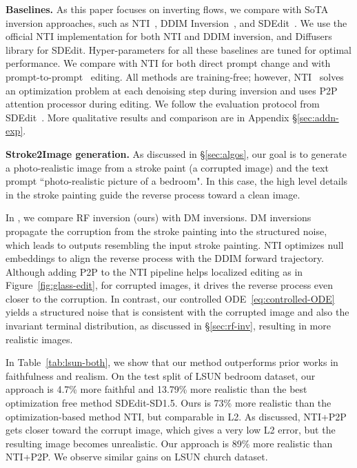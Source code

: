 \documentclass{article} %
\theoremstyle{plain}
\begin{document}
\textbf{Baselines.} 
As this paper focuses on inverting flows, we compare with SoTA inversion approaches, such as NTI~\citep{nti}, DDIM Inversion~\citep{ddim}, and SDEdit~\citep{sdedit}. 
We use the official NTI implementation for both NTI and DDIM inversion, and Diffusers library for SDEdit.
Hyper-parameters for all these baselines are tuned for optimal performance.
We compare with NTI for both direct prompt change and with prompt-to-prompt~\cite{p2p} editing.
All methods are training-free; however, NTI~\citep{nti} solves an optimization problem at each denoising step during inversion and uses P2P~\citep{p2p} attention processor during editing.
We follow the evaluation protocol from SDEdit~\citep{sdedit}. More qualitative results and comparison are in Appendix \S\ref{sec:addn-exp}.


\textbf{Stroke2Image generation.}
As discussed in \S\ref{sec:algos}, our goal is to generate a photo-realistic image from a stroke paint (a corrupted image) and the text prompt ``photo-realistic picture of a bedroom".
In this case, the high level details in the stroke painting guide the reverse process toward a clean image. 

In , we compare RF inversion (ours) with DM inversions.
DM inversions propagate the corruption from the stroke painting into the structured noise,
which leads to outputs resembling the input stroke painting. 
NTI optimizes null embeddings to align the reverse process with the DDIM forward trajectory. 
Although adding P2P to the NTI pipeline helps localized editing as in Figure~\ref{fig:glass-edit}, for corrupted images, it drives the reverse process even closer to the corruption.
In contrast, our controlled ODE~\eqref{eq:controlled-ODE} yields a structured noise that is consistent with the corrupted image and also the invariant terminal distribution, as discussed in \S\ref{sec:rf-inv}, resulting in more realistic images.



In Table~\ref{tab:lsun-both}, we show that our method outperforms prior works in faithfulness and realism. 
On the test split of LSUN bedroom dataset, our approach is 4.7\% more faithful and 13.79\% more realistic than the best optimization free method SDEdit-SD1.5. Ours is 73\% more realistic than the optimization-based method NTI, but comparable in L2. As discussed, NTI+P2P gets closer toward the corrupt image, which gives a very low L2 error, but the resulting image becomes unrealistic. Our approach is 89\% more realistic than NTI+P2P. We observe similar gains on LSUN church dataset. 
\end{document}
